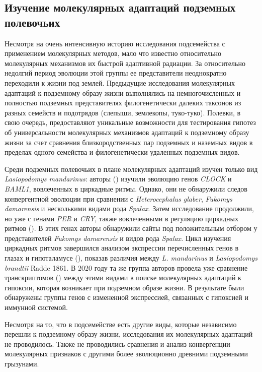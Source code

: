 \subsection{Изучение молекулярных адаптаций подземных полевочьих}

Несмотря на очень интенсивную историю исследования подсемейства с применением молекулярных методов, мало что известно относительно молекулярных механизмов их быстрой адаптивной радиации. За относительно недолгий период эволюции этой группы ее представители неоднократно переходили к жизни под землей. Предыдущие исследования молекулярных адаптаций к подземному образу жизни выполнялись на немногочисленных и полностью подземных представителях филогенетически далеких таксонов из разных семейств и подотрядов (слепыши, землекопы, туко-туко). Полевки, в свою очередь, предоставляют уникальные возможности для тестирования гипотез об универсальности молекулярных механизмов адаптаций к подземному образу жизни за счет сравнения близкородственных пар подземных и наземных видов в пределах одного семейства и филогенетически удаленных подземных видов. 

Среди подземных полевочьих в плане молекулярных адаптаций изучен только вид \textit{Lasiopodomys mandarinus}: авторы (\cite{Sun2018a}) изучили эволюцию генов \textit{CLOCK} и \textit{BAML1}, вовлеченных в циркадные ритмы. Однако, они не обнаружили следов конвергентной эволюции при сравнении с \textit{Heterocephalus glaber}, \textit{Fukomys damarensis} и несколькими видами рода \textit{Spalax}. Затем исследование продолжили, но уже с генами \textit{PER} и \textit{CRY}, также вовлеченными в регуляцию циркадных ритмов (\cite{Sun2018}). В этих генах авторы обнаружили сайты под положительным отбором у представителей \textit{Fukomys damarensis} и видов рода \textit{Spalax}. Цикл изучения циркадных ритмов завершился анализом экспрессии перечисленных генов в глазах и гипоталамусе (\cite{Sun2020}), показав различия между \textit{L. mandarinus} и \textit{Lasiopodomys brandtii} Radde 1861. В 2020 году та же группа авторов провела уже сравнение транскриптомов (\cite{Dong2020}) между этими видами в поиске молекулярных адаптаций к гипоксии, которая возникает при подземном образе жизни. В результате были обнаружены группы генов с измененной экспрессией, связанных с гипоксией и иммунной системой. 

Несмотря на то, что в подсемействе есть другие виды, которые независимо перешли к подземному образу жизни, исследования их молекулярных адаптаций не проводилось. Также не проводились сравнения и анализ конвергенции молекулярных признаков с другими более эволюционно древними подземными грызунами.
 